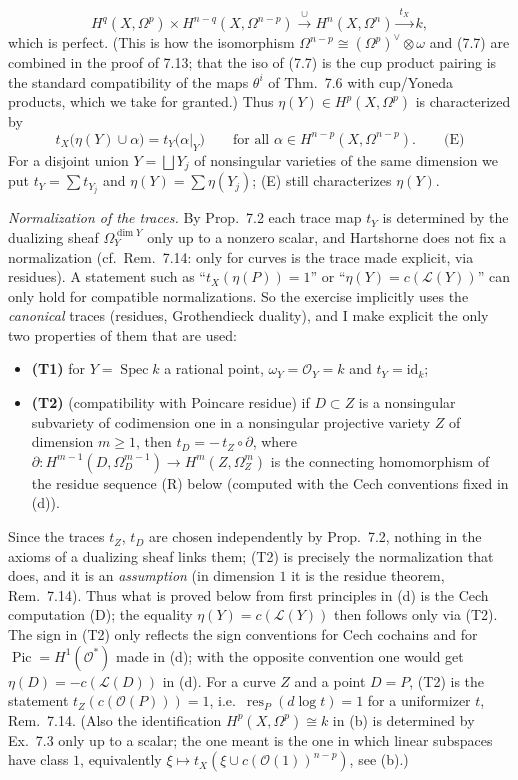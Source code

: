\documentclass[11pt]{article}
\begin{document}
\[
H^q(X,\Omega^p)\times H^{n-q}(X,\Omega^{n-p})\xrightarrow{\ \cup\ }H^n(X,\Omega^n)\xrightarrow{\ t_X\ }k ,
\]
which is perfect. (This is how the isomorphism $\Omega^{n-p}\cong(\Omega^p)^\vee\otimes\omega$ and (7.7) are combined in the proof of 7.13; that the iso of (7.7) is the cup product pairing is the standard compatibility of the maps $\theta^i$ of Thm.~7.6 with cup/Yoneda products, which we take for granted.) Thus $\eta(Y)\in H^p(X,\Omega^p)$ is characterized by
\[
t_X\big(\eta(Y)\cup\alpha\big)=t_Y\big(\alpha|_Y\big)\qquad\text{for all }\alpha\in H^{n-p}(X,\Omega^{n-p}) .\qquad\text{(E)}
\]
For a disjoint union $Y=\bigsqcup Y_j$ of nonsingular varieties of the same dimension we put $t_Y=\sum t_{Y_j}$ and $\eta(Y)=\sum\eta(Y_j)$; (E) still characterizes $\eta(Y)$.

\emph{Normalization of the traces.} By Prop.~7.2 each trace map $t_Y$ is determined by the dualizing sheaf $\Omega^{\dim Y}_Y$ only up to a nonzero scalar, and Hartshorne does not fix a normalization (cf.\ Rem.~7.14: only for curves is the trace made explicit, via residues). A statement such as ``$t_X(\eta(P))=1$'' or ``$\eta(Y)=c(\mathcal L(Y))$'' can only hold for compatible normalizations. So the exercise implicitly uses the \emph{canonical} traces (residues, Grothendieck duality), and I make explicit the only two properties of them that are used:
\begin{itemize}
\item \textbf{(T1)} for $Y=\operatorname{Spec}k$ a rational point, $\omega_Y=\mathcal O_Y=k$ and $t_Y=\mathrm{id}_k$;
\item \textbf{(T2)} (compatibility with Poincare residue) if $D\subset Z$ is a nonsingular subvariety of codimension one in a nonsingular projective variety $Z$ of dimension $m\ge1$, then $t_D=-\,t_Z\circ\partial$, where $\partial\colon H^{m-1}(D,\Omega^{m-1}_D)\to H^m(Z,\Omega^m_Z)$ is the connecting homomorphism of the residue sequence (R) below (computed with the Cech conventions fixed in (d)).
\end{itemize}
Since the traces $t_Z$, $t_D$ are chosen independently by Prop.~7.2, nothing in the axioms of a dualizing sheaf links them; (T2) is precisely the normalization that does, and it is an \emph{assumption} (in dimension $1$ it is the residue theorem, Rem.~7.14). Thus what is proved below from first principles in (d) is the Cech computation (D); the equality $\eta(Y)=c(\mathcal L(Y))$ then follows only via (T2). The sign in (T2) only reflects the sign conventions for Cech cochains and for $\operatorname{Pic}=H^1(\mathcal O^*)$ made in (d); with the opposite convention one would get $\eta(D)=-c(\mathcal L(D))$ in (d). For a curve $Z$ and a point $D=P$, (T2) is the statement $t_Z(c(\mathcal O(P)))=1$, i.e.\ $\operatorname{res}_P(d\log t)=1$ for a uniformizer $t$, Rem.~7.14. (Also the identification $H^p(X,\Omega^p)\cong k$ in (b) is determined by Ex.~7.3 only up to a scalar; the one meant is the one in which linear subspaces have class $1$, equivalently $\xi\mapsto t_X(\xi\cup c(\mathcal O(1))^{n-p})$, see (b).)
\end{document}
